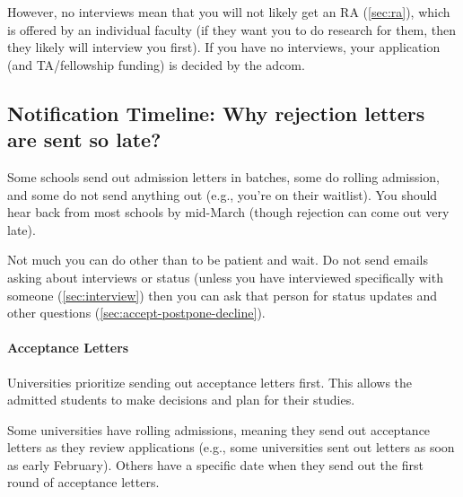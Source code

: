 \documentclass[oneside,11pt,dvipsnames]{book}
\def\subsectioninfo#1{%
    \addcontentsline{toc}{subsectioninfo}{%
    \noexpand\numberline{}\color{black}{#1}}%
}
\begin{document}
However, no interviews mean that you will not likely get an RA (\autoref{sec:ra}), which is offered by an individual faculty (if they want you to do research for them, then they likely will interview you first).  If you have no interviews, your application (and TA/fellowship funding) is decided by the adcom.



\subsection{Notification Timeline: Why rejection letters are sent so late?}\label{sec:late-rejection}
\subsectioninfo{Grad programs often wait for the accepted students to make their decisions, typically by April 15, before sending out rejection letters.}


Some schools send out admission letters in batches, some do rolling admission, and some do not send anything out (e.g., you're on their waitlist). You should hear back from most schools by mid-March (though rejection can come out very late).

Not much you can do other than to be patient and wait. Do not send emails asking about interviews or status (unless you have interviewed specifically with someone (\autoref{sec:interview}) then you can ask that person for status updates and other questions (\autoref{sec:accept-postpone-decline}).



\paragraph{Acceptance Letters} Universities prioritize sending out acceptance letters first. This allows the admitted students to make decisions and plan for their studies.

Some universities have rolling admissions, meaning they send out acceptance letters as they review applications (e.g., some universities sent out letters as soon as early February). Others have a specific date when they send out the first round of acceptance letters.   
\end{document}
